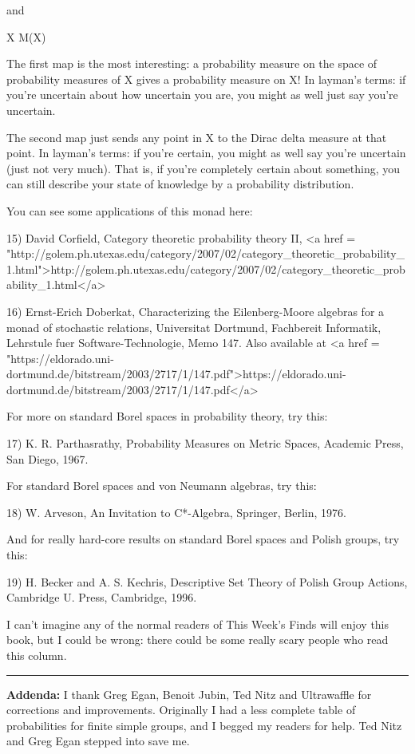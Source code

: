 and 

X \to  M(X)

The first map is the most interesting: a probability measure
on the space of probability measures of X gives a probability
measure on X!  In layman's terms: if you're uncertain about
how uncertain you are, you might as well just say you're uncertain.

The second map just sends any point in X to the Dirac delta measure at
that point.  In layman's terms: if you're certain, you might as well
say you're uncertain (just not very much).  That is, if you're
completely certain about something, you can still describe your state
of knowledge by a probability distribution.

You can see some applications of this monad here:

15) David Corfield, Category theoretic probability theory II,
<a href = "http://golem.ph.utexas.edu/category/2007/02/category_theoretic_probability_1.html">http://golem.ph.utexas.edu/category/2007/02/category_theoretic_probability_1.html</a>

16) Ernst-Erich Doberkat, Characterizing the Eilenberg-Moore 
algebras for a monad of stochastic relations, Universitat 
Dortmund, Fachbereit Informatik, Lehrstule fuer Software-Technologie,
Memo 147.  Also available at 
<a href = "https://eldorado.uni-dortmund.de/bitstream/2003/2717/1/147.pdf">https://eldorado.uni-dortmund.de/bitstream/2003/2717/1/147.pdf</a>

For more on standard Borel spaces in probability theory, try this:

17) K. R. Parthasrathy, Probability Measures on Metric Spaces, 
Academic Press, San Diego, 1967.

For standard Borel spaces and von Neumann algebras, try this:

18) W. Arveson, An Invitation to C*-Algebra, Springer, Berlin, 1976.

And for really hard-core results on standard Borel spaces and 
Polish groups, try this:

19) H. Becker and A. S. Kechris, Descriptive Set Theory of Polish 
Group Actions, Cambridge U. Press, Cambridge, 1996.

I can't imagine any of the normal readers of This Week's Finds 
will enjoy this book, but I could be wrong: there could be some
really scary people who read this column.

\par\noindent\rule{\textwidth}{0.4pt}
\textbf{Addenda:} I thank Greg Egan, Benoit Jubin,
Ted Nitz and Ultrawaffle for corrections 
and improvements.   Originally I had a less complete table of 
probabilities for finite simple groups, and I begged my readers for 
help.  Ted Nitz and Greg Egan stepped into save me.

